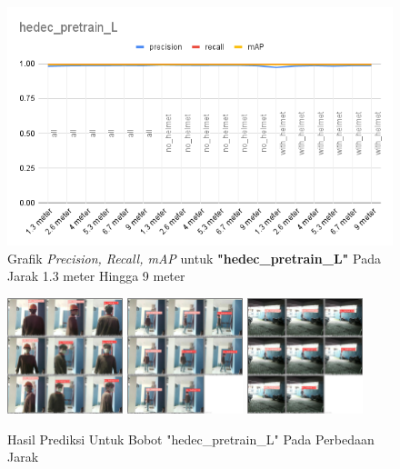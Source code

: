 \begin{enumerate}
  \begin{figure} [h!]
    \centering
    \includegraphics[width=1\textwidth]{gambar/BerdasarkanJarak/hedec_pretrain_L.png}
    \caption{Grafik \emph{Precision, Recall, mAP} untuk \textbf{"hedec\_pretrain\_L"} Pada Jarak 1.3 meter Hingga 9 meter}
    \label{fig:grafvaljarak_hedec_pretrain_L}  
  \end{figure}

  \begin{figure} [h!]
    \centering
    \includegraphics[width=0.3\textwidth]{gambar/BerdasarkanJarak_v2/val_hedec_pretrain_L/Jarak1_3/val_batch0_pred.jpg}
    \includegraphics[width=0.3\textwidth]{gambar/BerdasarkanJarak_v2/val_hedec_pretrain_L/Jarak5_3/val_batch0_pred.jpg}
    \includegraphics[width=0.3\textwidth]{gambar/BerdasarkanJarak_v2/val_hedec_pretrain_L/Jarak9/val_batch0_pred.jpg}
    \caption{Hasil Prediksi Untuk Bobot "hedec\_pretrain\_L" Pada Perbedaan Jarak}
    \label{fig:valjarak_sample_hedec_pretrain_L}  
  \end{figure}

\end{enumerate}


